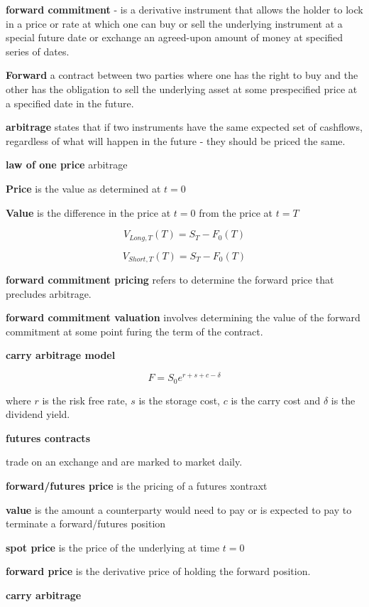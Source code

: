 \documentclass[12pt]{article}
\begin{document}
\newpage

\textbf{forward commitment} - is a derivative instrument that allows the holder to lock in a price or rate at which one can buy or sell the underlying instrument at a special future date or exchange an agreed-upon amount of money at specified series of dates.

\textbf{Forward} a contract between two parties where one has the right to buy and the other has the obligation to sell the underlying asset at some prespecified price at a specified date in the future.

\textbf{arbitrage}  states that if two instruments have the same expected set of cashflows, regardless of what will happen in the future - they should be priced the same. 

\textbf{law of one price} arbitrage

\textbf{Price} is the value as determined at $t=0$

\textbf{Value} is the difference in the price at $t=0$ from the price at $t=T$

$$
V_{Long,T}(T) = S_T - F_0 (T)
$$

$$
V_{Short,T}(T) = S_T - F_0 (T)
$$

\textbf{forward commitment pricing} refers to determine the forward price that precludes arbitrage. 

\textbf{forward commitment valuation} involves determining the value of the forward commitment at some point furing the term of the contract. 

\textbf{carry arbitrage model}

$$
F = S_0 e^{r + s + c - \delta}
$$

where $r$ is the risk free rate, $s$ is the storage cost, $c$ is the carry cost and $\delta$ is the dividend yield. 

\textbf{futures contracts} 

trade on an exchange and are marked to market daily. 


\textbf{forward/futures price} is the pricing of a futures xontraxt

\textbf{value} is the amount a counterparty would need to pay or is expected to pay to terminate a forward/futures position
	
\textbf{spot price} is the price of the underlying at time $t=0$

\textbf{forward price} is the derivative price of holding the forward position. 

\textbf{carry arbitrage}
\end{document}
